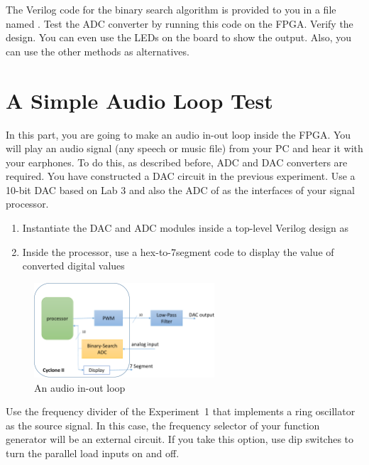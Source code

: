 \documentclass[12pt, logo=tehranDLDL/ut]{tehranDLDL}
\begin{document}
The Verilog code for the binary search algorithm is provided to you in a file named . Test the ADC converter by running this code on the FPGA. Verify the design. You can even use the LEDs on the board to show the output. Also, you can use the other methods as alternatives.

\designverification{}

\section{A Simple Audio Loop Test}

In this part, you are going to make an audio in-out loop inside the FPGA. You will play an audio signal (any speech or music file) from your PC and hear it with your earphones. To do this, as described before, ADC and DAC converters are required. You have constructed a DAC circuit in the previous experiment. Use a 10-bit DAC based on Lab 3 and also the ADC of  as the interfaces of your signal processor.

\begin{enumerate}
    \item Instantiate the DAC and ADC modules inside a top-level Verilog design as 
    \item Inside the processor, use a hex-to-7segment code to display the value of converted digital values 
\end{enumerate}

\begin{figure}
    \centering
    \caption{An audio in-out loop\label{fig:loop}}
    \includegraphics[width=0.6\textwidth]{loop}
\end{figure}

Use the frequency divider of the Experiment~1 that implements a ring oscillator as the source signal. In this case, the frequency selector of your function generator will be an external circuit. If you take this option, use dip switches to turn the parallel load inputs on and off.

\designverification{}
\end{document}

